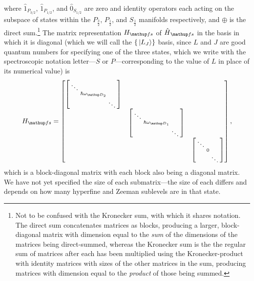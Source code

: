 where $\hat1_{P_{3/2}}$, $\hat1_{P_{1/2}}$, and $\hat 0_{S_{1/2}}$ are zero and identity operators each acting on the subspace of states within the $P_{\frac32}$, $P_{\frac12}$, and $S_{\frac12}$ manifolds respectively, and $\oplus$ is the direct sum.\footnote{Not to be confused with the Kronecker sum, with which it shares notation. The direct sum concatenates matrices as blocks, producing a larger, block-diagonal matrix with dimension equal to the \emph{sum} of the dimensions of the matrices being direct-summed, whereas the Kronecker sum is the the regular sum of matrices after each has been multiplied using the Kronecker-product with identity matrices with sizes of the other matrices in the sum, producing matrices with dimension equal to the \emph{product} of those being summed.} The matrix representation $H_\up{fs}$ of $\hat H_\up{fs}$ in the basis in which it is diagonal (which we will call the $\{\ket{L_J}\}$ basis, since $L$ and $J$ are good quantum numbers for specifying one of the three states, which we write with the spectroscopic notation letter---$S$ or $P$---corresponding to the value of $L$ in place of its numerical value) is
\begin{align}
H_\up{fs}  = 
\left[\begin{matrix}
    \left[\begin{smallmatrix}\ddots &&\\&\hbar\omega_{\up{D}_2}&\\&&\ddots\\\end{smallmatrix} \right]\\
    & \left[\begin{smallmatrix}\ddots &&\\&\hbar\omega_{\up{D}_1}&\\&&\ddots\\\end{smallmatrix} \right]\\
    & &\left[\begin{smallmatrix}\ddots &&\\&0&\\&&\ddots\\\end{smallmatrix} \right]
\end{matrix} \right],
\end{align}
which is a block-diagonal matrix with each block also being a diagonal matrix. We have not yet specified the size of each submatrix---the size of each differs and depends on how many hyperfine and Zeeman sublevels are in that state.

